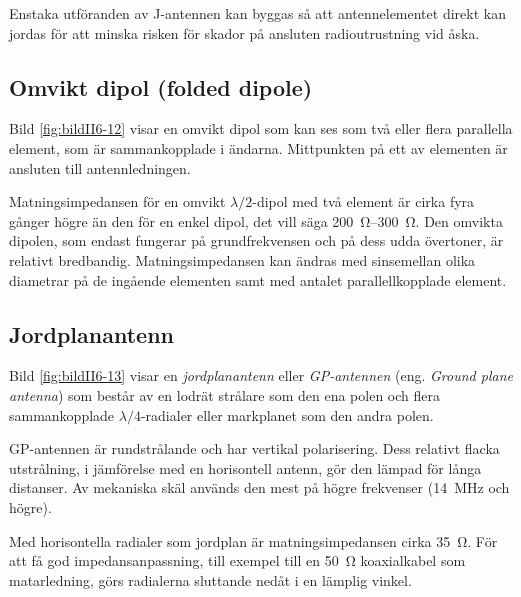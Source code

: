 Enstaka utföranden av J-antennen kan byggas så att antennelementet direkt kan
jordas för att minska risken för skador på ansluten radioutrustning vid åska.


\subsection{Omvikt dipol (folded dipole)}

Bild \ref{fig:bildII6-12} visar en omvikt dipol som kan ses som två eller flera
parallella element, som är sammankopplade i ändarna.
Mittpunkten på ett av elementen är ansluten till antennledningen.

Matningsimpedansen för en omvikt \(\lambda/2\)-dipol med två element är
cirka fyra gånger högre än den för en enkel dipol, det vill säga
\SIrange{200}{300}{\ohm}.
Den omvikta dipolen, som endast fungerar på grundfrekvensen och på
dess udda övertoner, är relativt bredbandig.
Matningsimpedansen kan ändras med sinsemellan olika diametrar på de ingående
elementen samt med antalet parallellkopplade element.


\subsection{Jordplanantenn}

Bild \ref{fig:bildII6-13} visar en \emph{jordplanantenn} eller
\emph{GP-antennen} (eng. \emph{Ground plane antenna}) som består av en
lodrät strålare som den ena polen och flera sammankopplade
\(\lambda/4\)-radialer eller markplanet som den andra polen.

GP-antennen är rundstrålande och har vertikal polarisering.
Dess relativt flacka utstrålning, i jämförelse med en horisontell antenn,
gör den lämpad för långa distanser.
Av mekaniska skäl används den mest på högre frekvenser (\SI{14}{\mega\hertz}
och högre).

Med horisontella radialer som jordplan är matningsimpedansen cirka
\SI{35}{\ohm}.
För att få god impedansanpassning, till exempel till en \SI{50}{\ohm}
koaxialkabel som matarledning, görs radialerna sluttande nedåt i en lämplig
vinkel.

